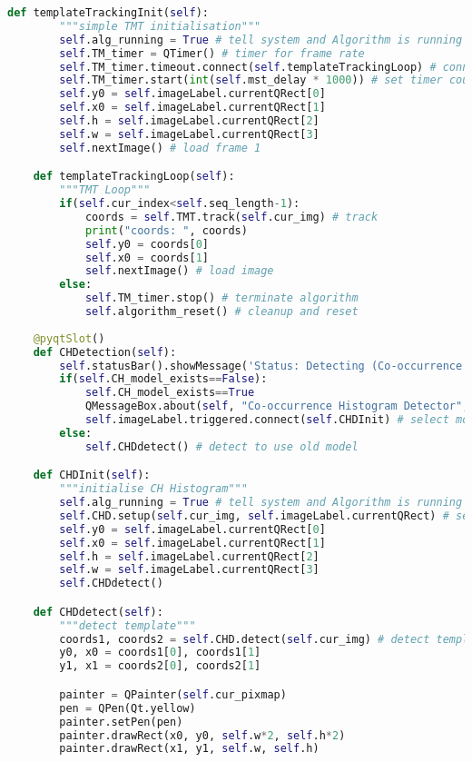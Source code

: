 \begin{lstlisting}[language=Python, caption={GUI Impementation Code}, captionpos=b, label={lst:gui}]
    def templateTrackingInit(self):
        """simple TMT initialisation"""
        self.alg_running = True # tell system and Algorithm is running
        self.TM_timer = QTimer() # timer for frame rate
        self.TM_timer.timeout.connect(self.templateTrackingLoop) # connect timeouts to fetching next image
        self.TM_timer.start(int(self.mst_delay * 1000)) # set timer countdown rate        
        self.y0 = self.imageLabel.currentQRect[0]
        self.x0 = self.imageLabel.currentQRect[1]
        self.h = self.imageLabel.currentQRect[2]
        self.w = self.imageLabel.currentQRect[3]
        self.nextImage() # load frame 1

    def templateTrackingLoop(self):
        """TMT Loop"""
        if(self.cur_index<self.seq_length-1):
            coords = self.TMT.track(self.cur_img) # track    
            print("coords: ", coords)
            self.y0 = coords[0]
            self.x0 = coords[1]
            self.nextImage() # load image    
        else:
            self.TM_timer.stop() # terminate algorithm
            self.algorithm_reset() # cleanup and reset
    
    @pyqtSlot()
    def CHDetection(self):
        self.statusBar().showMessage('Status: Detecting (Co-occurrence Histogram)')
        if(self.CH_model_exists==False):
            self.CH_model_exists==True
            QMessageBox.about(self, "Co-occurrence Histogram Detector", "Select Object to Detect") 
            self.imageLabel.triggered.connect(self.CHDInit) # select model
        else:
            self.CHDdetect() # detect to use old model

    def CHDInit(self):
        """initialise CH Histogram"""
        self.alg_running = True # tell system and Algorithm is running
        self.CHD.setup(self.cur_img, self.imageLabel.currentQRect) # setup mean shift tracker with coords
        self.y0 = self.imageLabel.currentQRect[0]
        self.x0 = self.imageLabel.currentQRect[1]
        self.h = self.imageLabel.currentQRect[2]
        self.w = self.imageLabel.currentQRect[3]
        self.CHDdetect()

    def CHDdetect(self):
        """detect template"""
        coords1, coords2 = self.CHD.detect(self.cur_img) # detect template 
        y0, x0 = coords1[0], coords1[1]
        y1, x1 = coords2[0], coords2[1]

        painter = QPainter(self.cur_pixmap)
        pen = QPen(Qt.yellow)
        painter.setPen(pen)
        painter.drawRect(x0, y0, self.w*2, self.h*2)
        painter.drawRect(x1, y1, self.w, self.h)


\end{lstlisting}
